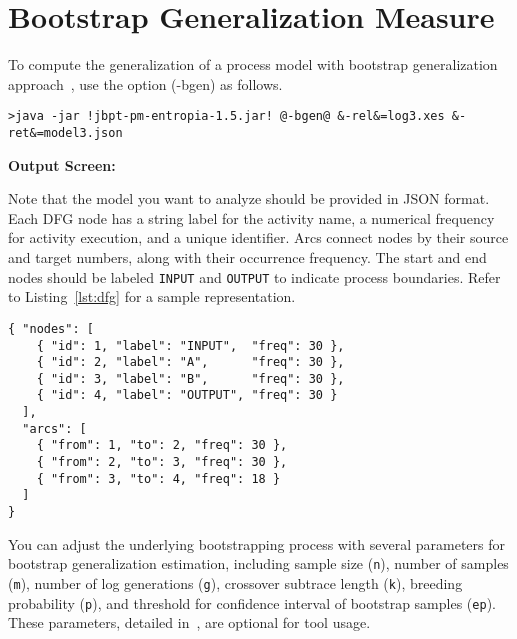 \section*{Bootstrap Generalization Measure}
\setcounter{subsection}{0}

To compute the generalization of a process model with bootstrap generalization approach~\cite{Polyvyanyy2022Bootstrapping}, use the option (\textcolor{darkcandyapplered}{\footnotesize\ttfamily-bgen}) as follows.
\begin{lstlisting}[style=CL]
>java -jar !jbpt-pm-entropia-1.5.jar! @-bgen@ &-rel&=log3.xes &-ret&=model3.json
\end{lstlisting}

\textbf{Output Screen:}%


Note that the model you want to analyze should be provided in JSON format.
Each DFG node has a string label for the activity name, a numerical frequency for activity execution, and a unique identifier.
Arcs connect nodes by their source and target numbers, along with their occurrence frequency.
The start and end nodes should be labeled \texttt{INPUT} and \texttt{OUTPUT} to indicate process boundaries.
Refer to Listing~\ref{lst:dfg} for a sample representation.

\begin{minipage}[t]{\textwidth}
        \vspace{0pt}
        \begin{lstlisting}[caption={Sample JSON representation.}, label={lst:dfg}]
{ "nodes": [
    { "id": 1, "label": "INPUT",  "freq": 30 },
    { "id": 2, "label": "A",      "freq": 30 },
    { "id": 3, "label": "B",      "freq": 30 },
    { "id": 4, "label": "OUTPUT", "freq": 30 }
  ],
  "arcs": [
    { "from": 1, "to": 2, "freq": 30 },
    { "from": 2, "to": 3, "freq": 30 },
    { "from": 3, "to": 4, "freq": 18 }
  ]
}
        \end{lstlisting}
    \end{minipage}

You can adjust the underlying bootstrapping process with several parameters for bootstrap generalization estimation, including sample size (\texttt{n}), number of samples (\texttt{m}), number of log generations (\texttt{g}), crossover subtrace length (\texttt{k}), breeding probability (\texttt{p}), and threshold for confidence interval of bootstrap samples (\texttt{ep}).
These parameters, detailed in~\cite{Polyvyanyy2022Bootstrapping}, are optional for tool usage.

